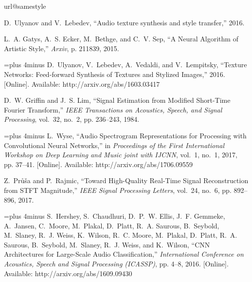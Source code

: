 \documentclass{article}
\begin{document}
\small
\begin{thebibliography}{1}
\providecommand{\url}[1]{#1}
\csname url@samestyle\endcsname
\providecommand{\newblock}{\relax}
\providecommand{\bibinfo}[2]{#2}
\providecommand{\BIBentrySTDinterwordspacing}{\spaceskip=0pt\relax}
\providecommand{\BIBentryALTinterwordstretchfactor}{4}
\providecommand{\BIBentryALTinterwordspacing}{\spaceskip=\fontdimen2\font plus
\BIBentryALTinterwordstretchfactor\fontdimen3\font minus
  \fontdimen4\font\relax}
\providecommand{\BIBforeignlanguage}[2]{{%
\expandafter\ifx\csname l@#1\endcsname\relax
\typeout{** WARNING: IEEEtran.bst: No hyphenation pattern has been}%
\typeout{** loaded for the language `#1'. Using the pattern for}%
\typeout{** the default language instead.}%
\else
\language=\csname l@#1\endcsname
\fi
#2}}
\providecommand{\BIBdecl}{\relax}
\BIBdecl

D.~Ulyanov and V.~Lebedev, ``{Audio texture synthesis and style transfer},''
  2016.

L.~A. Gatys, A.~S. Ecker, M.~Bethge, and C.~V. Sep, ``{A Neural Algorithm of
  Artistic Style},'' \emph{Arxiv}, p. 211839, 2015.

\BIBentryALTinterwordspacing
D.~Ulyanov, V.~Lebedev, A.~Vedaldi, and V.~Lempitsky, ``{Texture Networks:
  Feed-forward Synthesis of Textures and Stylized Images},'' 2016. [Online].
  Available: \url{http://arxiv.org/abs/1603.03417}
\BIBentrySTDinterwordspacing

D.~W. Griffin and J.~S. Lim, ``{Signal Estimation from Modified Short-Time
  Fourier Transform},'' \emph{IEEE Transactions on Acoustics, Speech, and
  Signal Processing}, vol.~32, no.~2, pp. 236--243, 1984.

\BIBentryALTinterwordspacing
L.~Wyse, ``{Audio Spectrogram Representations for Processing with Convolutional
  Neural Networks},'' in \emph{Proceedings of the First International Workshop
  on Deep Learning and Music joint with IJCNN}, vol.~1, no.~1, 2017, pp.
  37--41. [Online]. Available: \url{http://arxiv.org/abs/1706.09559}
\BIBentrySTDinterwordspacing

Z.~Prů{\v{s}}a and P.~Rajmic, ``{Toward High-Quality Real-Time Signal
  Reconstruction from STFT Magnitude},'' \emph{IEEE Signal Processing Letters},
  vol.~24, no.~6, pp. 892--896, 2017.

\BIBentryALTinterwordspacing
S.~Hershey, S.~Chaudhuri, D.~P.~W. Ellis, J.~F. Gemmeke, A.~Jansen, C.~Moore,
  M.~Plakal, D.~Platt, R.~A. Saurous, B.~Seybold, M.~Slaney, R.~J. Weiss,
  K.~Wilson, R.~C. Moore, M.~Plakal, D.~Platt, R.~A. Saurous, B.~Seybold,
  M.~Slaney, R.~J. Weiss, and K.~Wilson, ``{CNN Architectures for Large-Scale
  Audio Classification},'' \emph{International Conference on Acoustics, Speech
  and Signal Processing (ICASSP)}, pp. 4--8, 2016. [Online]. Available:
  \url{http://arxiv.org/abs/1609.09430}
\BIBentrySTDinterwordspacing


\end{thebibliography}
\end{document}
